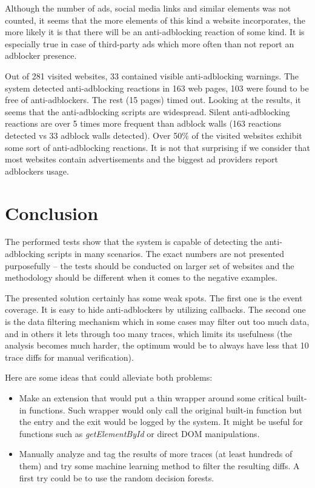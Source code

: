 Although the number of ads, social media links and similar elements was not counted, it seems that the more 
elements of this kind a website incorporates, the more likely it is that there will be an anti-adblocking reaction of some kind.
It is especially true in case of third-party ads which more often than not report an adblocker presence.

Out of 281 visited websites, 33 contained visible anti-adblocking warnings. 
The system detected anti-adblocking reactions in 163 web pages, 103 were found to be free of anti-adblockers.
The rest (15 pages) timed out.
Looking at the results, it seems that the anti-adblocking scripts are widespread. 
Silent anti-adblocking reactions are over 5 times more frequent than adblock walls
(163 reactions detected vs 33 adblock walls detected). Over 50\% of the visited websites exhibit some sort of
anti-adblocking reactions. It is not that surprising if we consider that most websites contain advertisements
and the biggest ad providers report adblockers usage.


\section{Conclusion}

The performed tests show that the system is capable of detecting the anti-adblocking scripts in many scenarios.
The exact numbers are not presented purposefully -- the tests should be conducted on larger set of websites
and the methodology should be different when it comes to the negative examples.

The presented solution certainly has some weak spots. The first one is the event coverage. 
It is easy to hide anti-adblockers by utilizing callbacks. The second one is the data 
filtering mechanism which in some cases may filter out too much data,
and in others it lets through too many traces, which limits its usefulness (the analysis becomes much harder,
the optimum would be to always have less that 10 trace diffs for manual verification).

Here are some ideas that could alleviate both problems:
\begin{itemize}
  \item Make an extension that would put a thin wrapper around some critical built-in functions. Such wrapper would only
           call the original built-in function but the entry and the exit would be logged by the system.
           It might be useful for functions such as \emph{getElementById} or direct DOM manipulations.
  \item Manually analyze and tag the results of more traces (at least hundreds of them) 
           and try some machine learning method to filter the resulting diffs. 
           A first try could be to use the random decision forests.
\end{itemize}

